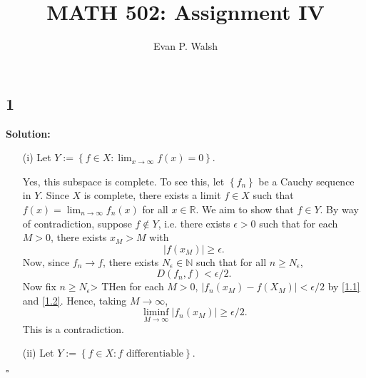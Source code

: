 \documentclass[12pt]{article}
\title{MATH 502: Assignment IV}
\author{Evan P. Walsh}
\newcounter{ProofCounter}
\newenvironment{Solution}{\stepcounter{ProofCounter}\textbf{Solution:}}{\hfill$\square$}
\begin{document}
\maketitle

\subsection*{1}
\begin{Solution}
  \begin{enumerate}
    \item[(i)] Let $Y := \left\{ f \in X : \lim_{x\rightarrow \infty}f(x) = 0 \right\}$.

      Yes, this subspace is complete. To see this, let $\left\{ f_{n} \right\}$ be a Cauchy sequence in $Y$. Since $X$ is complete, there exists a limit $f
      \in X$ such that $f(x) = \lim_{n\rightarrow \infty}f_{n}(x)$ for all $x \in \mathbb{R}$. We aim to show that $f \in Y$. By way of contradiction,
      suppose $f \notin Y$, i.e. there exists $\epsilon > 0$ such that for each $M > 0$, there exists $x_{M} > M$ with 
      \begin{equation}
        |f(x_{M})| \geq \epsilon.
        \label{1.1}
      \end{equation}
      Now, since $f_{n} \rightarrow f$, there exists $N_{\epsilon} \in \mathbb{N}$ such that for all $n \geq N_{\epsilon}$, 
      \begin{equation}
        D(f_n, f) < \epsilon /2.
        \label{1.2}
      \end{equation}
      Now fix $n \geq N_{\epsilon}$> THen for each $M > 0$, $|f_{n}(x_{M}) - f(X_{M})| < \epsilon / 2$ by \eqref{1.1} and \eqref{1.2}. Hence, taking
      $M \rightarrow \infty$, 
      \[
        \liminf_{M\rightarrow\infty} |f_{n}(x_{M})| \geq \epsilon / 2.
      \]
      This is a contradiction.

    \item[(ii)] Let $Y := \left\{ f\in X : f \text{ differentiable} \right\}$.


\end{enumerate}
\end{Solution}
\end{document}
